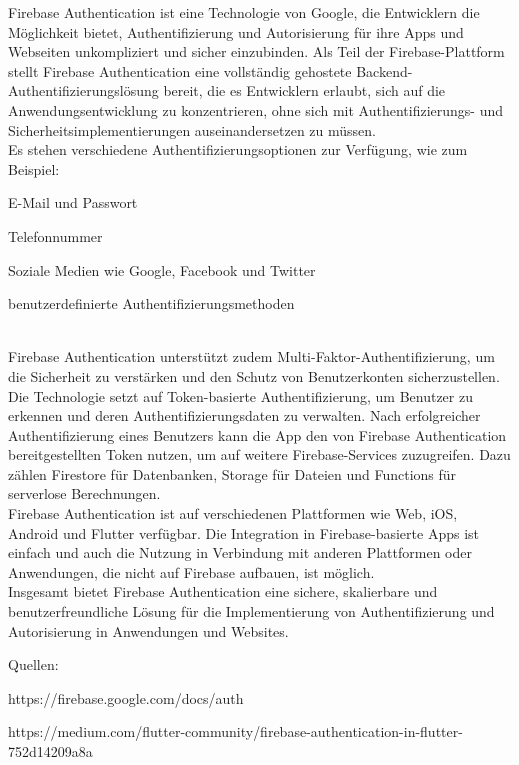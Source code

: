 Firebase Authentication ist eine Technologie von Google, die Entwicklern die Möglichkeit bietet, Authentifizierung und Autorisierung für ihre Apps und Webseiten unkompliziert und sicher einzubinden. Als Teil der Firebase-Plattform stellt Firebase Authentication eine vollständig gehostete Backend-Authentifizierungslösung bereit, die es Entwicklern erlaubt, sich auf die Anwendungsentwicklung zu konzentrieren, ohne sich mit Authentifizierungs- und Sicherheitsimplementierungen auseinandersetzen zu müssen.
\\
Es stehen verschiedene Authentifizierungsoptionen zur Verfügung, wie zum Beispiel:
\begin{compactitem}
    \item E-Mail und Passwort
    \item Telefonnummer
    \item Soziale Medien wie Google, Facebook und Twitter
    \item benutzerdefinierte Authentifizierungsmethoden
\end{compactitem}
\\
Firebase Authentication unterstützt zudem Multi-Faktor-Authentifizierung, um die Sicherheit zu verstärken und den Schutz von Benutzerkonten sicherzustellen.
\\
Die Technologie setzt auf Token-basierte Authentifizierung, um Benutzer zu erkennen und deren Authentifizierungsdaten zu verwalten. Nach erfolgreicher Authentifizierung eines Benutzers kann die App den von Firebase Authentication bereitgestellten Token nutzen, um auf weitere Firebase-Services zuzugreifen. Dazu zählen Firestore für Datenbanken, Storage für Dateien und Functions für serverlose Berechnungen.
\\
Firebase Authentication ist auf verschiedenen Plattformen wie Web, iOS, Android und Flutter verfügbar. Die Integration in Firebase-basierte Apps ist einfach und auch die Nutzung in Verbindung mit anderen Plattformen oder Anwendungen, die nicht auf Firebase aufbauen, ist möglich.
\\
Insgesamt bietet Firebase Authentication eine sichere, skalierbare und benutzerfreundliche Lösung für die Implementierung von Authentifizierung und Autorisierung in Anwendungen und Websites.

Quellen:

https://firebase.google.com/docs/auth

https://medium.com/flutter-community/firebase-authentication-in-flutter-752d14209a8a

